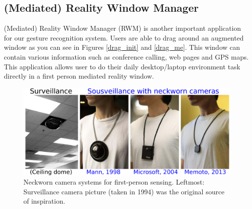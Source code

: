 \subsection{(Mediated) Reality Window Manager}
(Mediated) Reality Window Manager (RWM) is another important application for our gesture recognition system. Users are able to drag around an augmented window as you can see in Figures \ref{drag_init} and \ref{drag_me}. This window can contain various information such as conference calling, web pages and GPS maps. This application allows user to do their daily desktop/laptop environment task directly in a first person mediated reality window.

\begin{figure}
\centering
\includegraphics[width=6in]{ch5/figs/coop_surveillance_sousveillance_fixed_with_vi.pdf}
\caption{Neckworn camera systems for first-person sensing.
         Leftmost: Surveillance camera picture (taken in 1994) was the original
         source of inspiration.} 
\label{neckcams} 
\end{figure}

